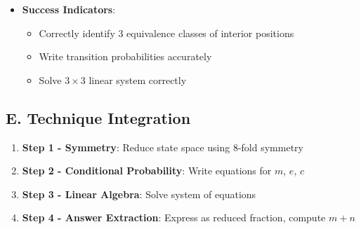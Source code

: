 \documentclass[12pt]{article}
\begin{document}
\begin{techniquesbox}
\begin{itemize}[leftmargin=*]
    \item \textbf{Success Indicators}: 
    \begin{itemize}
        \item Correctly identify 3 equivalence classes of interior positions
        \item Write transition probabilities accurately
        \item Solve $3 \times 3$ linear system correctly
    \end{itemize}
\end{itemize}

\subsection*{E. Technique Integration}
\begin{enumerate}[leftmargin=*]
    \item \textbf{Step 1 - Symmetry}: Reduce state space using 8-fold symmetry
    \item \textbf{Step 2 - Conditional Probability}: Write equations for $m$, $e$, $c$
    \item \textbf{Step 3 - Linear Algebra}: Solve system of equations
    \item \textbf{Step 4 - Answer Extraction}: Express as reduced fraction, compute $m+n$
\end{enumerate}

\end{techniquesbox}
\end{document}
